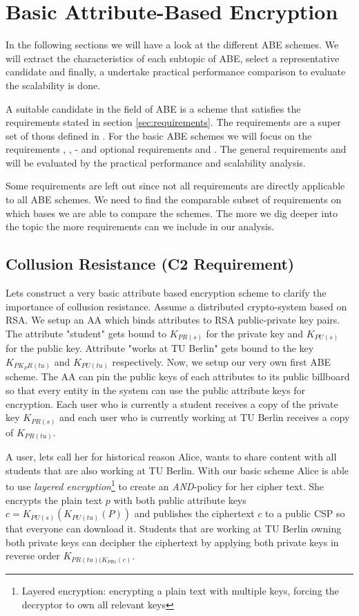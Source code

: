 \section{Basic Attribute-Based Encryption}
In the following sections we will have a look at the different ABE schemes. We will extract the  characteristics of each subtopic of ABE, select a representative candidate and finally, a undertake practical performance comparison to evaluate the scalability is done. 

A suitable candidate in the field of ABE is a scheme that satisfies the requirements stated in section \ref{sec:requirements}. The requirements are a super set of thous defined in \cite{lee2013survey}. For the basic \ac{ABE} schemes we will focus on the requirements , ,  -  and optional requirements  and .
The general requirements  and  will be evaluated by the practical performance and scalability analysis.

Some requirements are left out since not all requirements are directly applicable to all ABE schemes. We need to find the comparable subset of requirements on which bases we are able to compare the schemes. The more we dig deeper into the topic the more requirements can we include in our analysis. 

\subsection{Collusion Resistance (C2 Requirement)}
Lets construct a very basic attribute based encryption scheme to clarify the importance of collusion resistance. Assume a distributed crypto-system based on \ac{RSA}. We setup an \ac{AA} which binds attributes to \ac{RSA} public-private key pairs. The attribute "student" gets bound to $K_{PR(s)}$ for the private key and $K_{PU(s)}$ for the public key. Attribute "works at TU Berlin" gets bound to the key $K_{PK_PR(tu)}$ and $K_{PU(tu)}$ respectively. Now, we setup our very own first ABE scheme. The AA can pin the public keys of each attributes to its public billboard so that every entity in the system can use the public attribute keys for encryption. Each user who is currently a student receives a copy of the private key $K_{PR(s)}$ and each user who is currently working at TU Berlin receives a copy of $K_{PR(tu)}$. 

A user, lets call her for historical reason Alice, wants to share content with all students that are also working at TU Berlin. With our basic scheme Alice is able to use \textit{layered encryption}\footnote{Layered encryption: encrypting a plain text with multiple keys, forcing the decryptor to own all relevant keys} to create an \textit{AND}-policy for her cipher text. She encrypts the plain text $p$ with both public attribute keys $c = K_{PU(s)}(K_{PU(tu)}(P))$ and publishes the ciphertext $c$ to a public CSP so that everyone can download it. Students that are working at TU Berlin owning both private keys can decipher the ciphertext by applying both private keys in reverse order $K_{PR(tu)(K_{PR{s}}(c)}$.

